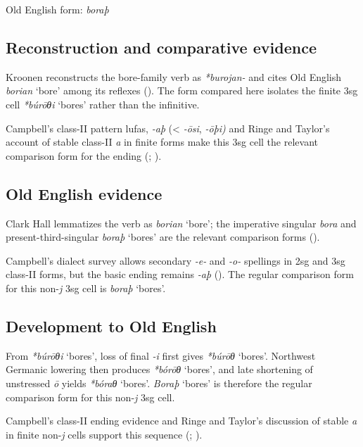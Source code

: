 \documentclass[
  british,
  a4paper,
  openany]{book}
\providecommand{\Recon}[1]{\emph{*#1}}
{\catcode`→=\active \global\def→{\ensuremath{\rightarrow}}}
\providecommand{\Recon}[1]{\emph{*#1}}
{\catcode`→=\active \global\def→{\ensuremath{\rightarrow}}}
\begin{document}
Old English form: \emph{boraþ}

\subsection{Reconstruction and comparative
evidence}\label{reconstruction-and-comparative-evidence-129}

Kroonen reconstructs the bore-family verb as \emph{*burojan-} and cites
Old English {\emph{borian}} `bore' among its reflexes
(). The form compared here
isolates the finite 3sg cell \Recon{búrōθi} `bores' rather than the
infinitive.

Campbell's class-II pattern lufas, \emph{-aþ} (\textless{} \emph{-ōsi},
\emph{-ōþi)} and Ringe and Taylor's account of stable class-II \emph{a}
in finite forms make this 3sg cell the relevant comparison form for the
ending (;
).

\subsection{Old English evidence}\label{old-english-evidence-129}

Clark Hall lemmatizes the verb as {\emph{borian}} `bore'; the imperative
singular \emph{bora} and present-third-singular {\emph{boraþ}} `bores'
are the relevant comparison forms ().

Campbell's dialect survey allows secondary \emph{-e-} and \emph{-o-}
spellings in 2sg and 3sg class-II forms, but the basic ending remains
\emph{-aþ} (). The
regular comparison form for this non-\emph{j} 3sg cell is {\emph{boraþ}}
`bores'.

\subsection{Development to Old
English}\label{development-to-old-english-129}

From \Recon{búrōθi} `bores', loss of final \emph{-i} first gives
\Recon{búrōθ} `bores'. Northwest Germanic lowering then produces
\Recon{bórōθ} `bores', and late shortening of unstressed \emph{ō} yields
\Recon{bóraθ} `bores'. {\emph{Boraþ}} `bores' is therefore the regular
comparison form for this non-\emph{j} 3sg cell.

Campbell's class-II ending evidence and Ringe and Taylor's discussion of
stable \emph{a} in finite non-\emph{j} cells support this sequence
(;
).
\end{document}
